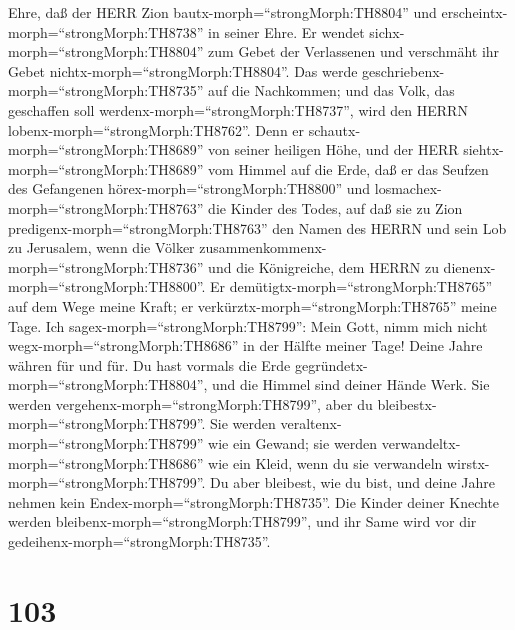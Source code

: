 Ehre,  daß der HERR Zion bautx-morph=``strongMorph:TH8804''
und erscheintx-morph=``strongMorph:TH8738'' in seiner Ehre.
 Er wendet sichx-morph=``strongMorph:TH8804'' zum Gebet der
Verlassenen und verschmäht ihr Gebet
nichtx-morph=``strongMorph:TH8804''.  Das werde
geschriebenx-morph=``strongMorph:TH8735'' auf die Nachkommen; und das
Volk, das geschaffen soll werdenx-morph=``strongMorph:TH8737'', wird den
HERRN lobenx-morph=``strongMorph:TH8762''.  Denn er
schautx-morph=``strongMorph:TH8689'' von seiner heiligen Höhe, und der
HERR siehtx-morph=``strongMorph:TH8689'' vom Himmel auf die Erde,
 daß er das Seufzen des Gefangenen
hörex-morph=``strongMorph:TH8800'' und
losmachex-morph=``strongMorph:TH8763'' die Kinder des Todes,
 auf daß sie zu Zion predigenx-morph=``strongMorph:TH8763''
den Namen des HERRN und sein Lob zu Jerusalem,  wenn die
Völker zusammenkommenx-morph=``strongMorph:TH8736'' und die Königreiche,
dem HERRN zu dienenx-morph=``strongMorph:TH8800''.  Er
demütigtx-morph=``strongMorph:TH8765'' auf dem Wege meine Kraft; er
verkürztx-morph=``strongMorph:TH8765'' meine Tage.  Ich
sagex-morph=``strongMorph:TH8799'': Mein Gott, nimm mich nicht
wegx-morph=``strongMorph:TH8686'' in der Hälfte meiner Tage! Deine Jahre
währen für und für.  Du hast vormals die Erde
gegründetx-morph=``strongMorph:TH8804'', und die Himmel sind deiner
Hände Werk.  Sie werden
vergehenx-morph=``strongMorph:TH8799'', aber du
bleibestx-morph=``strongMorph:TH8799''. Sie werden
veraltenx-morph=``strongMorph:TH8799'' wie ein Gewand; sie werden
verwandeltx-morph=``strongMorph:TH8686'' wie ein Kleid, wenn du sie
verwandeln wirstx-morph=``strongMorph:TH8799''.  Du aber
bleibest, wie du bist, und deine Jahre nehmen kein
Endex-morph=``strongMorph:TH8735''.  Die Kinder deiner
Knechte werden bleibenx-morph=``strongMorph:TH8799'', und ihr Same wird
vor dir gedeihenx-morph=``strongMorph:TH8735''.

\hypertarget{section-102}{%
\section{103}\label{section-102}}

